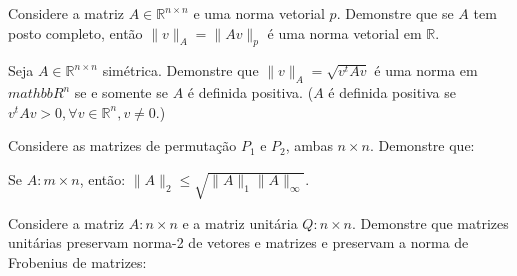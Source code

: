 \documentclass[a4paper,12pt, leqno, answers]{exam}
\begin{document}
\thispagestyle{headandfoot}
\begin{questions}
    \question Considere a matriz $A \in \mathbb{R}^{n \times n}$ e uma norma vetorial $p$. Demonstre que se $A$ tem posto completo, ent\~{a}o $\| v \|_A = \| A v \|_p$ \'{e} uma norma vetorial em $\mathbb{R}$.
    \begin{solution}
        
    \end{solution}

    \question Seja $A \in \mathbb{R}^{n \times n}$ sim\'{e}trica. Demonstre que $\| v \|_A = \sqrt{v^t A v}$ \'{e} uma norma em $mathbb{R}^n$ se e somente se $A$ \'{e} definida positiva. ($A$ \'{e} definida positiva se $v^t A v > 0, \forall v \in \mathbb{R}^n, v \neq 0$.)
    \begin{solution}
        
    \end{solution}

    \question Considere as matrizes de permuta\c{c}\~{a}o $P_1$ e $P_2$, ambas $n \times n$. Demonstre que:

     Se $A : m \times n$, ent\~{a}o: $\| A \|_2 \leq \sqrt{\| A \|_1 \| A \|_\infty}$.
    \begin{solution}
        
    \end{solution}

    \question Considere a matriz $A: n \times n$ e a matriz unit\'{a}ria $Q : n \times n$. Demonstre que matrizes unit\'{a}rias preservam norma-2 de vetores e matrizes e preservam a norma de Frobenius de matrizes:
    \begin{parts}

\end{parts}
\end{questions}
\end{document}
